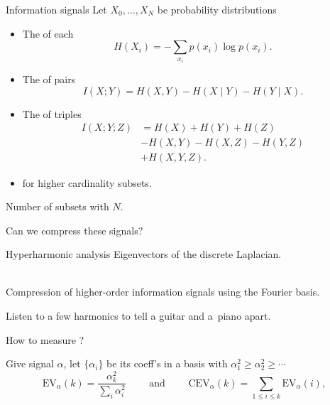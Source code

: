 \begin{frame}{Information signals}
	\pause
	Let $X_0, \dots, X_N$ be probability distributions

	\vskip 5pt

	\begin{itemize}
		\pause\item The  of each
		\[
		\textstyle H(X_i) = - \sum_{x_i} p(x_i) \log p(x_i).
		\]
		\vspace*{-20pt}\pause\item The  of pairs
		\[
		I(X; Y) = H(X, Y) - H(X \mid Y) - H(Y \mid X).
		\]
		\vspace*{-20pt}\pause\item The  of triples
		\begin{align*}
			I(X;Y;Z) &=
			H(X) + H(Y) + H(Z) \\
			& - H(X,Y) - H(X,Z) - H(Y,Z) \\
			& + H(X,Y,Z).
		\end{align*}
		\vspace*{-20pt}\pause\item {} for higher cardinality subsets.
	\end{itemize}

	\pause\smallskip

	 Number of subsets  with $N$.

	\smallskip
	 Can we compress these signals?
\end{frame}

\begin{frame}{Hyperharmonic analysis}
	\pause
	 Eigenvectors of the discrete Laplacian.

	\pause\bigskip
	\\
	Compression of higher-order information signals using the Fourier basis.

	\pause\bigskip
	 Listen to a few harmonics to tell a guitar and a~piano apart.

	\pause\bigskip
	How to measure ?

	\pause\bigskip
	Give signal $\alpha$, let $\{\alpha_i\}$ be its coeff's in a basis with $\alpha_1^2 \geq \alpha_2^2 \geq \cdots$
	\begin{equation*}
		\text{EV}_{\alpha}(k) = \frac{ \alpha_k^2}{{\displaystyle \sum_{i} \alpha_i^2}}
		\qquad \text{ and } \qquad
		\text{CEV}_{\alpha}(k) = \sum_{1\leq i \leq k} \text{EV}_{\alpha}(i),
	\end{equation*}
\end{frame}

